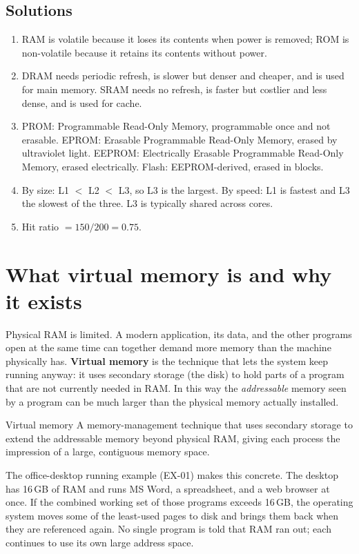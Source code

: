 \subsection*{Solutions}
\begingroup\small
\begin{enumerate}[label=\arabic*.]
  \item RAM is volatile because it loses its contents when power is
    removed; ROM is non-volatile because it retains its contents without
    power.
  \item DRAM needs periodic refresh, is slower but denser and cheaper, and
    is used for main memory. SRAM needs no refresh, is faster but costlier
    and less dense, and is used for cache.
  \item PROM: Programmable Read-Only Memory, programmable once and not
    erasable. EPROM: Erasable Programmable Read-Only Memory, erased by
    ultraviolet light. EEPROM: Electrically Erasable Programmable Read-Only
    Memory, erased electrically. Flash: EEPROM-derived, erased in blocks.
  \item By size: L1 $<$ L2 $<$ L3, so L3 is the largest. By speed: L1 is
    fastest and L3 the slowest of the three. L3 is typically shared across
    cores.
  \item Hit ratio $= 150/200 = 0.75$.
\end{enumerate}
\endgroup

\section{What virtual memory is and why it exists}
Physical RAM is limited. A modern application, its data, and the other
programs open at the same time can together demand more memory than the
machine physically has. \textbf{Virtual memory} is the technique that lets the
system keep running anyway: it uses secondary storage (the disk) to hold parts
of a program that are not currently needed in RAM. In this way the \emph{addressable}
memory seen by a program can be much larger than the physical memory actually
installed.

\begin{definitionbox}{Virtual memory}
A memory-management technique that uses secondary storage to extend the
addressable memory beyond physical RAM, giving each process the impression of a
large, contiguous memory space.
\end{definitionbox}

The office-desktop running example (EX-01) makes this concrete. The desktop has
16\,GB of RAM and runs MS Word, a spreadsheet, and a web browser at once. If the
combined working set of those programs exceeds 16\,GB, the operating system
moves some of the least-used pages to disk and brings them back when they are
referenced again. No single program is told that RAM ran out; each continues to
use its own large address space.

